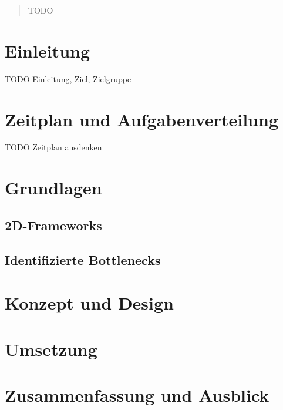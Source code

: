 \begin{abstract}
TODO
\end{abstract}

\chapter{Einleitung}
TODO Einleitung, Ziel, Zielgruppe


\chapter{Zeitplan und Aufgabenverteilung}
TODO Zeitplan ausdenken


\chapter{Grundlagen}
\section{2D-Frameworks}
\section{Identifizierte Bottlenecks}

\chapter{Konzept und Design}

\chapter{Umsetzung}

\chapter{Zusammenfassung und Ausblick}

